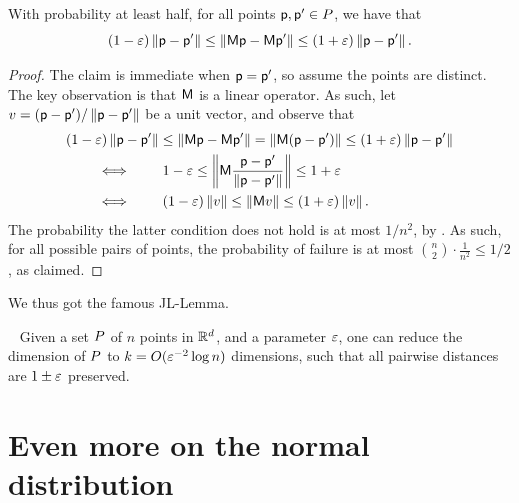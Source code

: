 \begin{lemma}
    With probability at least half, for all points $\mathsf{p}, \mathsf{p}' \in
    P$, we have that
    \begin{equation*}
        (1-\eps) \distY{\pnt}{\pnt'}%
        \leq%
        \distY{ \Matrix \pnt}{\Matrix \pnt' }%
        \leq%
        (1+\eps) \distY{\pnt}{\pnt'}.%
    \end{equation*}
\end{lemma}
\begin{proof}
    The claim is immediate when $\mathsf{p}=\mathsf{p}'$, so assume the points
    are distinct. The key observation is that $\mathsf{M}$ is a linear
    operator. As such, let $v = (\mathsf{p} - \mathsf{p}') / \left\| {\mathsf{p} - \mathsf{p}'} \right\|$ be a unit
    vector, and observe that
    \begin{align*}
      &(1-\eps) \distY{\pnt}{\pnt'}%
        \leq%
        \distY{ \Matrix \pnt}{\Matrix \pnt' }%
        =%
        \norm{ \Matrix( \pnt- \pnt') }%
        \leq%
        (1+\eps) \distY{\pnt}{\pnt'}
      \\&%
      \qquad \iff \qquad%
      1-\eps %
      \leq%
        \norm{ \Matrix\frac{ \pnt- \pnt'}{\distY{\pnt}{\pnt'}} }%
        \leq%
      1+\eps
      \\&%
      \qquad \iff \qquad%
      (1-\eps) \norm{v}%
      \leq%
      \norm{ \Matrix v  }%
      \leq%
      (1+\eps) \norm{v}.        
    \end{align*}
    The probability the latter condition does not hold is at most
    $1/n^2$, by . As such, for all possible pairs
    of points, the probability of failure is at most
    $\binom{n}{2} \cdot \frac{1}{n^2} \leq 1/2$, as claimed.
\end{proof}

We thus got the famous J{}L-Lemma.

\begin{theorem}
    ~
    \noindent%
    Given a set $P$ of $n$ points in $\mathbb{R}^d$, and a parameter
    ${\varepsilon}$, one can reduce the dimension of $P$ to
    $k = O({\varepsilon}^{-2} \log n)$ dimensions, such that all pairwise distances
    are $1\pm {\varepsilon}$ preserved.
\end{theorem}


\section{Even more on the normal distribution}


